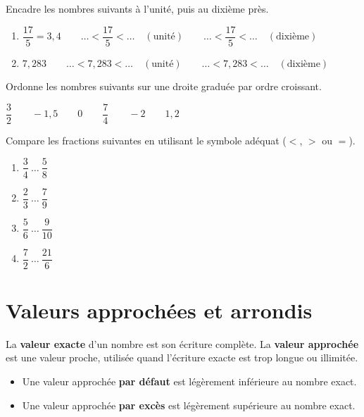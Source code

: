 \documentclass[../../syllabus_1.tex]{subfiles}
\begin{document}
\begin{itemize}
\begin{exercise}
    Encadre les nombres suivants à l'unité, puis au dixième près.
    \begin{enumerate}[itemsep=1.5cm]
        \item $\dfrac{17}{5} = 3{,}4 \qquad \dots < \dfrac{17}{5} < \dots \quad (\text{unité}) \qquad \dots < \dfrac{17}{5} < \dots \quad (\text{dixième})$
        \item $7{,}283 \qquad \dots < 7{,}283 < \dots \quad (\text{unité}) \qquad \dots < 7{,}283 < \dots \quad (\text{dixième})$
    \end{enumerate}
    \vspace{1em}
\end{exercise}

\begin{exercise}
    Ordonne les nombres suivants sur une droite graduée par ordre croissant.
    \begin{center}
        $\dfrac{3}{2} \qquad -1{,}5 \qquad 0 \qquad \dfrac{7}{4} \qquad -2 \qquad 1{,}2$
    \end{center}
    \vspace{1cm}
\end{exercise}


\begin{exercise}
    Compare les fractions suivantes en utilisant le symbole adéquat ($<$, $>$ ou $=$).
    \begin{enumerate}[cols=2, itemsep=0.7cm]
        \item $\dfrac{3}{4} \ \dots \ \dfrac{5}{8}$
        \item $\dfrac{2}{3} \ \dots \ \dfrac{7}{9}$
        \item $\dfrac{5}{6} \ \dots \ \dfrac{9}{10}$
        \item $\dfrac{7}{2} \ \dots \ \dfrac{21}{6}$
    \end{enumerate}
\end{exercise}

\newpage
\section{Valeurs approchées et arrondis}

La \textbf{valeur exacte} d'un nombre est son écriture complète. La \textbf{valeur approchée} est une valeur proche, utilisée quand l'écriture exacte est trop longue ou illimitée.

\begin{itemize}
    \item Une valeur approchée \textbf{par défaut} est légèrement inférieure au nombre exact.
    \item Une valeur approchée \textbf{par excès} est légèrement supérieure au nombre exact.
\end{itemize}


\end{itemize}
\end{document}
